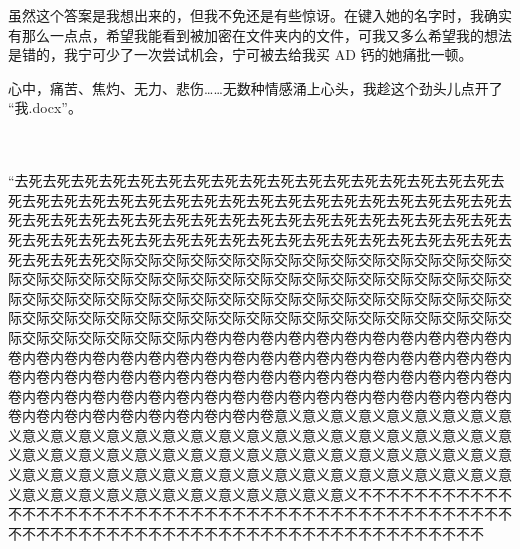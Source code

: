 \documentclass[UTF8]{ctexart}
\begin{document}
虽然这个答案是我想出来的，但我不免还是有些惊讶。在键入她的名字时，我确实有那么一点点，希望我能看到被加密在文件夹内的文件，可我又多么希望我的想法是错的，我宁可少了一次尝试机会，宁可被去给我买 AD 钙的她痛批一顿。

心中，痛苦、焦灼、无力、悲伤……无数种情感涌上心头，我趁这个劲头儿点开了 “我.docx”。

~\\
~\\

“去死去死去死去死去死去死去死去死去死去死去死去死去死去死去死去死去死去死去死去死去死去死去死去死去死去死去死去死去死去死去死去死去死去死去死去死去死去死去死去死去死去死去死去死去死去死去死去死去死去死去死去死去死去死去死去死去死去死去死去死去死去死去死去死去死去死去死去死去死去死去死去死去死去死去死交际交际交际交际交际交际交际交际交际交际交际交际交际交际交际交际交际交际交际交际交际交际交际交际交际交际交际交际交际交际交际交际交际交际交际交际交际交际交际交际交际交际交际交际交际交际交际交际交际交际交际交际交际交际交际交际交际交际交际交际交际交际交际交际交际交际交际交际交际交际交际交际交际交际交际内卷内卷内卷内卷内卷内卷内卷内卷内卷内卷内卷内卷内卷内卷内卷内卷内卷内卷内卷内卷内卷内卷内卷内卷内卷内卷内卷内卷内卷内卷内卷内卷内卷内卷内卷内卷内卷内卷内卷内卷内卷内卷内卷内卷内卷内卷内卷内卷内卷内卷内卷内卷内卷内卷内卷内卷内卷内卷内卷内卷内卷内卷内卷内卷内卷内卷内卷内卷内卷内卷内卷内卷内卷内卷内卷意义意义意义意义意义意义意义意义意义意义意义意义意义意义意义意义意义意义意义意义意义意义意义意义意义意义意义意义意义意义意义意义意义意义意义意义意义意义意义意义意义意义意义意义意义意义意义意义意义意义意义意义意义意义意义意义意义意义意义意义意义意义意义意义意义意义意义意义意义意义意义意义意义意义意义不不不不不不不不不不不不不不不不不不不不不不不不不不不不不不不不不不不不不不不不不不不不不不不不不不不不不不不不不不不不不不不不不不不不不不不不不不不不不不不不不
\end{document}
